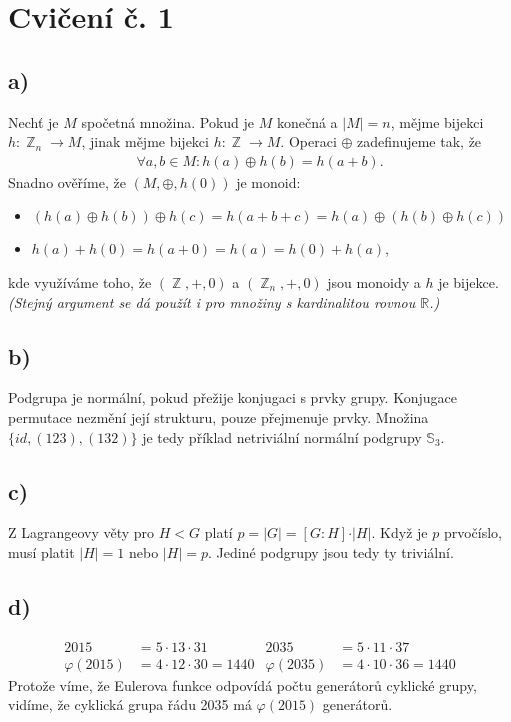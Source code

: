 \documentclass{scrartcl}
\DeclareMathOperator{\Z}{\mathbb{Z}}
\begin{document}
    \section*{Cvičení č. 1}
    \subsection*{a)}
    Nechť je $M$ spočetná množina. Pokud je $M$ konečná a $\vert M \vert = n$, mějme bijekci $h:\Z_n \rightarrow M$, jinak mějme bijekci $h: \Z \rightarrow M$. Operaci $\oplus$ zadefinujeme tak, že 
    \begin{align*}
        \forall a,b \in M: h(a)\oplus h(b)=h(a+b).
    \end{align*}
    Snadno ověříme, že $(M,\oplus,h(0))$ je monoid:
    \begin{itemize}
        \item $(h(a)\oplus h(b))\oplus h(c) = h(a+b+c) = h(a) \oplus (h(b)\oplus h(c))$
        \item $h(a) + h(0) = h(a+0) = h(a) = h(0) + h(a)$,
    \end{itemize}
    kde využíváme toho, že $(\Z,+,0)$ a $(\Z_n,+,0)$ jsou monoidy a $h$ je bijekce. \textit{(Stejný argument se dá použít i pro množiny s kardinalitou rovnou $\mathbb{R}$.)}

    \subsection*{b)}
    Podgrupa je normální, pokud přežije konjugaci s prvky grupy. Konjugace permutace nezmění její strukturu, pouze přejmenuje prvky. Množina $\{id,(123),(132)\}$ je tedy příklad netriviální normální podgrupy $\mathbb{S}_3$.

    \subsection*{c)}
    Z Lagrangeovy věty pro $H < G$ platí $p = \vert G\vert = [G:H] \cdot \vert H\vert$. Když je $p$ prvočíslo, musí platit $\vert H\vert = 1$ nebo $\vert H\vert = p$. Jediné podgrupy jsou tedy ty triviální.
    \subsection*{d)}
    \begin{align*}
        2015 &= 5\cdot 13\cdot 31 & 2035 &= 5\cdot 11\cdot 37 \\
        \varphi(2015) &= 4\cdot 12\cdot 30 = 1440 & \varphi(2035) &= 4\cdot 10\cdot 36 = 1440
    \end{align*}
    Protože víme, že Eulerova funkce odpovídá počtu generátorů cyklické grupy, vidíme, že cyklická grupa řádu 2035 má $\varphi(2015)$ generátorů.
\end{document}
